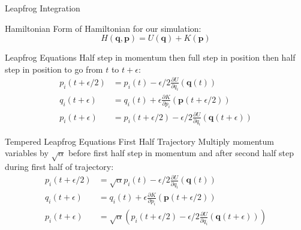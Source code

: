 \documentclass{beamer}
\begin{document}
    \begin{frame}{Leapfrog Integration}
    {
    \begin{block}{Hamiltonian}
        Form of Hamiltonian for our simulation:
        \begin{equation*}
            \label{eq:HamiltonianUPlusK}
            H\left(\bm{q},\bm{p}\right) = U\left(\bm{q}\right) + K\left(\bm{p}\right)
        \end{equation*}
    \end{block}
    }
    {
    \begin{block}{Leapfrog Equations}
        Half step in momentum then full step in position then half step in position to go from $t$ to $t+\epsilon$: 
        \begin{align*}
                p_i\left(t+\epsilon/2\right) &  = p_i\left(t\right) - \epsilon/2\frac{\partial U}{\partial q_i}\left(\bm{q}\left(t\right)\right) \\
                q_i\left(t+\epsilon\right) &  = q_i\left(t\right) + \epsilon\frac{\partial K}{\partial p_i}\left(\bm{p}\left(t+\epsilon/2\right)\right) \\
                p_i\left(t+\epsilon\right) &  = p_i\left(t+\epsilon/2\right) - \epsilon/2\frac{\partial U}{\partial q_i}\left(\bm{q}\left(t+\epsilon\right)\right)
            \end{align*}
    \end{block}
    }
    {
        \begin{block}{Tempered Leapfrog Equations First Half Trajectory}
            Multiply momentum variables by $\sqrt{\alpha}$ before first half step in momentum and after second half step during first half of trajectory:
            \begin{align*}
                 p_i\left(t+\epsilon/2\right) & = \sqrt{\alpha}p_i\left(t\right) - \epsilon/2\frac{\partial U}{\partial q_i}\left(\bm{q}\left(t\right)\right) \\
                \label{eq:TLeapFrogEq2}q_i\left(t+\epsilon\right) & = q_i\left(t\right) + \epsilon\frac{\partial K}{\partial p_i}\left(\bm{p}\left(t+\epsilon/2\right)\right) \\
                \label{eq:TLeapFrogEq3}p_i\left(t+\epsilon\right) & = \sqrt{\alpha}\left(p_i\left(t+\epsilon/2\right) - \epsilon/2\frac{\partial U}{\partial q_i}\left(\bm{q}\left(t+\epsilon\right)\right)\right)
            \end{align*}
        \end{block}
    }

\end{frame}
\end{document}
